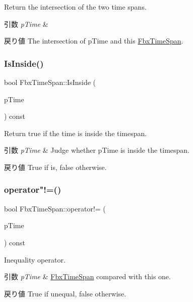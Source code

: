 Return the intersection of the two time spans. 
\begin{DoxyParams}{引数}
{\em p\+Time} & \\
\hline
\end{DoxyParams}
\begin{DoxyReturn}{戻り値}
The intersection of p\+Time and this \hyperlink{class_fbx_time_span}{Fbx\+Time\+Span}. 
\end{DoxyReturn}
\mbox{\label{class_fbx_time_span_a969295da345c8c9e574acbbcda1d59e0}} 
\subsubsection{\texorpdfstring{Is\+Inside()}{IsInside()}}
{\footnotesize\ttfamily bool Fbx\+Time\+Span\+::\+Is\+Inside (\begin{DoxyParamCaption}\item[{\hyperlink{class_fbx_time}{Fbx\+Time}}]{p\+Time }\end{DoxyParamCaption}) const}

Return {\ttfamily true} if the time is inside the timespan. 
\begin{DoxyParams}{引数}
{\em p\+Time} & Judge whether p\+Time is inside the timespan. \\
\hline
\end{DoxyParams}
\begin{DoxyReturn}{戻り値}
{\ttfamily True} if is, {\ttfamily false} otherwise. 
\end{DoxyReturn}
\mbox{\label{class_fbx_time_span_a2dd0bd644b3c8eb5fb79cc2866ea0420}} 
\subsubsection{\texorpdfstring{operator"!=()}{operator!=()}}
{\footnotesize\ttfamily bool Fbx\+Time\+Span\+::operator!= (\begin{DoxyParamCaption}\item[{const \hyperlink{class_fbx_time_span}{Fbx\+Time\+Span} \&}]{p\+Time }\end{DoxyParamCaption}) const}

Inequality operator. 
\begin{DoxyParams}{引数}
{\em p\+Time} & \hyperlink{class_fbx_time_span}{Fbx\+Time\+Span} compared with this one. \\
\hline
\end{DoxyParams}
\begin{DoxyReturn}{戻り値}
{\ttfamily True} if unequal, {\ttfamily false} otherwise. 
\end{DoxyReturn}
\mbox{\label{class_fbx_time_span_a1dac810b3c1c123bd3055befb96e42f7}} 
